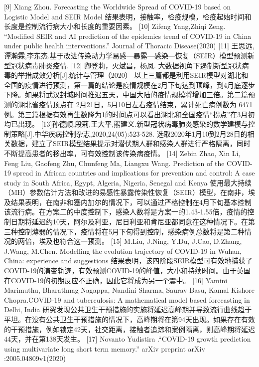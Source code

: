 \documentclass[lang=cn,11pt,a4paper,cite=authoryear]{elegantpaper}
\begin{document}
[9] Xiang Zhou. Forecasting the Worldwide Spread of COVID-19 based on Logistic Model and SEIR Model
结果表明，接触率，检疫规模，检疫起始时间和长度是控制流行病大小和长度的重要因素。
[10] Zifeng Yang,Zhiqi Zeng. “Modified SEIR and AI prediction of the epidemics trend of COVID-19 in China under public health interventions.” Journal of Thoracic Disease(2020)
[11] 王思远,谭瀚霖,李东杰.基于改进传染动力学易感—暴露—感染—恢复（SEIR）模型预测新型冠状病毒肺炎疫情.
[12] 卿登莉，火斌昌，杨凤. 大数据视角下遏制新型冠状病毒的举措成效分析[J].统计与管理（2020）
以上三篇都是利用SEIR模型对湖北和全国的疫情进行预测，第一篇的结论是疫情规模在2月下旬达到顶峰，到4月底逐步下降。如果将武汉封城时间推迟五天，中国大陆的疫情规模将增加三倍。第二篇预测的湖北省疫情顶点在 2月21日，5月10日左右疫情结束，累计死亡病例数为 6471例。第三篇根据有效再生数降为1的时间点可以看出湖北和全国疫情“拐点”在3月初均已出现。
[13]孙德顺,段莉,王大平,熊建义.新型冠状病毒肺炎感染的数学建模与控制策略[J].中华疾病控制杂志,2020,24(05):523-528.
选取2020年1月10到2月28日的相关数据，建立了SEIR模型结果提示对潜伏期人群和感染人群进行严格隔离，同时不断提高患者的移出率，可有效控制该传染病疫情。
[14] Zebin Zhao, Xin Li, Feng Liu, Gaofeng Zhu, Chunfeng Ma, Liangxu Wang. Prediction of the COVID-19 spread in African countries and implications for prevention and control: A case study in South Africa, Egypt, Algeria, Nigeria, Senegal and Kenya
使用最大持续（MH）参数估计方法和改进的易感性暴露传染性恢复（SEIR）模型，在南非，埃及结果表明，在南非和塞内加尔的情况下，可以通过严格控制在4月下旬基本控制该流行病。在方案二的中度控制下，感染人数将是方案一的1.43-1.55倍，疫情的控制日期将延迟约10天，阿尔及利亚，尼日利亚和肯尼亚都同意在这种情况下。在第三种控制薄弱的情况下，疫情将在5月下旬得到控制，感染病例总数将是第二种情况的两倍，埃及也符合这一预测。
[15] M.Liu, J.Ning, Y.Du, J.Cao, D.Zhang, J.Wang, M.Chen. Modelling the evolution trajectory of COVID-19 in Wuhan, China: experience and suggestions
结果表明，该四阶段SEIR模型可有效地捕获了COVID-19的演变轨迹，有效预测COVID-19的峰值，大小和持续时间。由于英国在COVID-19的初期反应不正确，因此它将成为另一个震中。
[16] Yamini Marimuthu, Bharathnag Nagappa, Nandini Sharma, Saurav Basu, Kamal Kishore Chopra.COVID-19 and tuberculosis: A mathematical model based forecasting in Delhi, India
研究发现公共卫生干预措施的实施将延迟高峰期并导致流行曲线趋于平坦。在没有公共卫生干预措施的情况下，高峰期将在第94天出现。如果存在有效的干预措施，例如锁定42天，社交距离，接触者追踪和案例隔离，则高峰期将延迟44天，并在第138天发生。
[17] Novanto Yudistira .“COVID-19 growth prediction using multivariate long short term memory.” arXiv preprint arXiv :2005.04809v1(2020)
\end{document}
